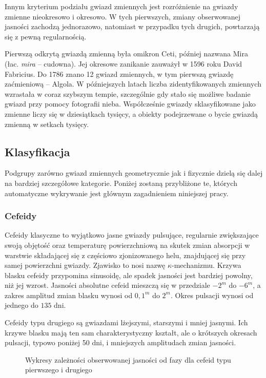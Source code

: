 \documentclass{pracalicmgr}
\begin{document}
    Innym kryterium podziału gwiazd zmiennych jest rozróżnienie na gwiazdy zmienne nieokresowo i okresowo. W tych pierwszych, zmiany obserwowanej jasności zachodzą jednorazowo, natomiast w przypadku tych drugich, powtarzają się z pewną regularnością. 
    
    Pierwszą odkrytą gwiazdą zmienną była omikron Ceti, później nazwana Mira (łac. \textit{mira} -- cudowna). Jej okresowe zanikanie zauważył w 1596 roku David Fabricius. Do 1786 znano 12 gwiazd zmiennych, w tym pierwszą gwiazdę zaćmieniową -- Algola. W późniejszych latach liczba zidentyfikowanych zmiennych wzrastała w coraz szybszym tempie, szczególnie gdy stało się możliwe badanie gwiazd przy pomocy fotografii nieba. Współcześnie gwiazdy sklasyfikowane jako zmienne liczy się w dziesiątkach tysięcy, a obiekty podejrzewane o bycie gwiazdą zmienną w setkach tysięcy.
    \subsection{Klasyfikacja}
    Podgrupy zarówno gwiazd zmiennych geometrycznie jak i fizycznie dzielą się dalej na bardziej szczegółowe kategorie. Poniżej zostaną przybliżone te, których automatyczne wykrywanie jest głównym zagadnieniem niniejszej pracy.
    \subsubsection{Cefeidy}
    Cefeidy klasyczne to wyjątkowo jasne gwiazdy pulsujące, regularnie zwiększające swoją objętość oraz temperaturę powierzchniową na skutek zmian absorpcji w warstwie składającej się z częściowo zjonizowanego helu, znajdującej się przy samej powierzchni gwiazdy. Zjawisko to nosi nazwę $\kappa$-mechanizmu. Krzywa blasku cefeidy przypomina sinusoidę, ale spadek jasności jest bardziej powolny, niż jej wzrost. Jasności absolutne cefeid mieszczą się w przedziale $-2^m$ do $-6^m$, a zakres amplitud zmian blasku wynosi od $0,1^m$ do $2^m$. Okres pulsacji wynosi od jednego do $135$ dni.
    
    Cefeidy typu drugiego są gwiazdami lżejszymi, starszymi i mniej jasnymi. Ich krzywe blasku mają ten sam charakterystyczny kształt, ale o krótszych okresach pulsacji, typowo poniżej 50 dni, i mniejszych amplitudach zmian jasności. 
\begin{figure}[!h]

    
    \caption{Wykresy zależności obserwowanej jasności od fazy dla cefeid typu pierwszego i drugiego}
    \label{fig:ceps}
\end{figure}
\end{document}
